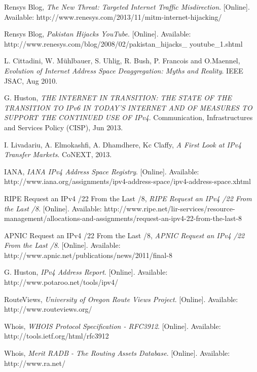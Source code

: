 \documentclass[11pt,a4paper]{scrreprt}
\begin{document}
\begin{thebibliography}{count}



    Rensys Blog,
    \emph{The New Threat: Targeted Internet Traffic Misdirection}.
    [Online]. Available: http://www.renesys.com/2013/11/mitm-internet-hijacking/


    Rensys Blog,
    \emph{Pakistan Hijacks YouTube}.
    [Online]. Available: http://www.renesys.com/blog/2008/02/pakistan\_hijacks\_
youtube\_1.shtml

	L. Cittadini, W. Mühlbauer, S. Uhlig, R. Bush, P. Francois and O.Maennel,
	\emph{Evolution of Internet Address Space Deaggregation: Myths and Reality}.
	IEEE JSAC, Aug 2010.

	G. Huston,
	\emph{THE INTERNET IN TRANSITION: THE STATE OF THE TRANSITION TO IPv6 IN TODAY'S
INTERNET AND OF MEASURES TO SUPPORT THE CONTINUED USE OF IPv4}.
	Communication, Infrastructures and Services Policy (CISP), Jun 2013.
	

	I. Livadariu, A. Elmokashfi, A. Dhamdhere, Kc Claffy,
	\emph{A First Look at IPv4 Transfer Markets}.
	CoNEXT, 2013.
	
	IANA,
	\emph{IANA IPv4 Address Space Registry}.
	[Online]. Available: http://www.iana.org/assignments/ipv4-address-space/ipv4-address-space.xhtml
	
	RIPE Request an IPv4 /22 From the Last /8,
	\emph{RIPE Request an IPv4 /22 From the Last /8}.
	[Online]. Available: http://www.ripe.net/lir-services/resource-management/allocations-and-assignments/request-an-ipv4-22-from-the-last-8

	APNIC Request an IPv4 /22 From the Last /8,
	\emph{APNIC Request an IPv4 /22 From the Last /8}.
	[Online]. Available: http://www.apnic.net/publications/news/2011/final-8
	
	G. Huston,
	\emph{IPv4 Address Report}.
	[Online]. Available: http://www.potaroo.net/tools/ipv4/

	RouteViews,
	\emph{University of Oregon Route Views Project}.
	[Online]. Available: http://www.routeviews.org/
	
	Whois,
	\emph{WHOIS Protocol Specification - RFC3912}.
	[Online]. Available: http://tools.ietf.org/html/rfc3912

	Whois,
	\emph{Merit RADB - The Routing Assets Database}.
	[Online]. Available: http://www.ra.net/


\end{thebibliography}
\end{document}
